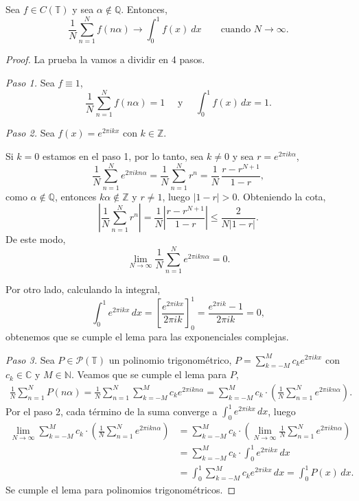 \begin{lemma} 
    \label{lem:lema_na}
    Sea $f \in C(\mathbb{T})$ y sea $\alpha \notin \mathbb{Q}$. Entonces, 
    \[
        \frac{1}{N} \sum_{n=1}^{N} f(n\alpha) \longrightarrow \int_0^1 f(x)\ dx
        \qquad \text{cuando } N \to \infty .
    \] 
\end{lemma}

\begin{proof}
    La prueba la vamos a dividir en 4 pasos.
    
    \textit{Paso 1. } Sea $f\equiv1$,
    \[
        \frac{1}{N} \sum_{n=1}^{N} f(n\alpha) = 1
        \quad \text{ y } \quad
        \int_0^1 f(x)\,dx = 1.
    \]

    \textit{Paso 2. } Sea $f(x)=e^{2\pi i k x}$ con $k\in\mathbb{Z}$.
    
    Si $k=0$ estamos en el paso 1, por lo tanto, sea $k\neq 0$ y sea $r=e^{2\pi i k \alpha}$,
    \[
        \frac{1}{N} \sum_{n=1}^{N} e^{2\pi i k n \alpha} =     
        \frac{1}{N} \sum_{n=1}^{N} r^n = 
        \frac{1}{N} \, \frac{r-r^{N+1}}{1-r},
    \]
    como $\alpha \notin \mathbb{Q}$, entonces $k\alpha \notin \mathbb{Z}$ y $r \neq 1$, 
    luego $|1-r|>0$. Obteniendo la cota,
    \[
        \left|\frac{1}{N} \sum_{n=1}^{N} r^n\right| =
        \frac{1}{N} \left|\frac{r-r^{N+1}}{1-r}\right| \leq
        \frac{2}{N|1-r|}.
    \]
    De este modo,
    \[
        \lim_{N \to \infty} \frac{1}{N} \sum_{n=1}^{N} e^{2\pi i k n \alpha} = 0 .
    \]

    Por otro lado, calculando la integral,
    \[
        \int_0^1 e^{2\pi i k x}\,dx = 
        \left[ \frac{e^{2\pi i k x}}{2\pi i k} \right]_0^1 =
        \frac{e^{2\pi i k}-1}{2\pi i k} = 0,
    \]
    obtenemos que se cumple el lema para las exponenciales complejas.

    \textit{Paso 3. } Sea $P \in \mathcal{P}(\mathbb{T})$ un polinomio trigonométrico, 
    $P=\sum_{k=-M}^M c_k e^{2\pi i k x}$ con $c_k \in \mathbb{C}$ y $M \in \mathbb{N}$. 
    Veamos que se cumple el lema para $P$,
    \begin{align*}
        \frac{1}{N} \sum_{n=1}^{N} P(n\alpha) 
        =\frac{1}{N} \sum_{n=1}^{N} \sum_{k=-M}^M c_k e^{2\pi i k n \alpha} 
        =\sum_{k=-M}^M c_k \cdot \left( \frac{1}{N} \sum_{n=1}^{N} e^{2\pi i k n \alpha}\right).
    \end{align*}
    Por el paso 2, cada término de la suma converge a $\int_0^1 e^{2\pi i k x}\,dx$, luego
    \begin{align*}
        \lim_{N \to \infty} \sum_{k=-M}^M c_k \cdot \left( \frac{1}{N} \sum_{n=1}^{N} e^{2\pi i k n \alpha}\right)    
        &=\sum_{k=-M}^M c_k \cdot \left( \lim_{N \to \infty} \frac{1}{N} \sum_{n=1}^{N} e^{2\pi i k n \alpha}\right) \\
        &=\sum_{k=-M}^M c_k \cdot \int_0^1 e^{2\pi i k x}\,dx \\
        &= \int_0^1 \sum_{k=-M}^M c_k e^{2\pi i k x}\,dx 
        =\int_0^1 P(x)\,dx.
    \end{align*}
    Se cumple el lema para polinomios trigonométricos.


\end{proof}
